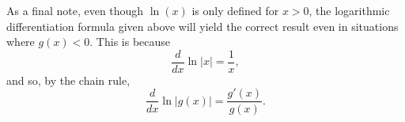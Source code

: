 \documentclass[handout]{ximera}
\begin{document}
As a final note, even though $\ln(x)$ is only defined for $x>0$, the logarithmic differentiation formula given above 
will yield the correct result even in situations where $g(x) <0$. This is because 
\[
\frac{d}{dx} \ln|x| = \frac{1}{x},
\]
and so, by the chain rule,
\[
\frac{d}{dx} \ln|g(x)| = \frac{g'(x)}{g(x)}.
\]
\end{document}
